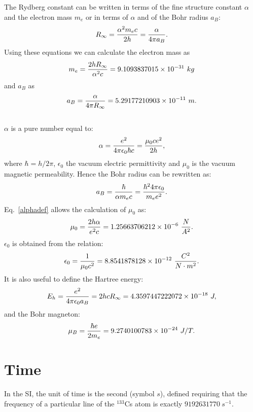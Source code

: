 \documentclass[12pt,a4paper]{article}
\def\me{9.1093837015\times 10^{-31}}
\def\abohr{5.29177210903\times 10^{-11}}
\def\muzero{1.25663706212\times 10^{-6}}
\def\epsilonzero{8.8541878128\times 10^{-12}}
\def\bohrmag{9.2740100783\times 10^{-24}}
\def\baru{4.3597447222072\times 10^{-18}}
\begin{document}
The Rydberg constant can be written in terms of the fine structure
constant $\alpha$ and the electron mass $m_e$ or in terms of $\alpha$ and
of the Bohr radius $a_B$:
\begin{equation}
R_\infty={\alpha^2 m_e c \over 2 h}={\alpha \over 4 \pi a_B}.
\end{equation}
Using these equations we can calculate the electron mass as
\begin{equation}
m_e={2 h R_\infty\over \alpha^2 c}=
\me\ kg
\end{equation} 
and $a_B$ as
\begin{equation}
a_B={\alpha\over 4\pi R_\infty}=
\abohr\ m.
\end{equation}
\\
$\alpha$ is a pure number equal to:
\begin{equation}
\alpha={e^2 \over 4 \pi \epsilon_0 \hbar c}= {\mu_0 c e^2 \over 2 h}, 
\label{alphadef}
\end{equation}
where $\hbar=h/2\pi$, $\epsilon_0$ the vacuum electric
permittivity and $\mu_0$ is the vacuum magnetic permeability. Hence
the Bohr radius can be rewritten as:
\begin{equation}
a_B={\hbar \over \alpha m_e c}=
{\hbar^2 4 \pi \epsilon_0 \over m_e e^2}.
\end{equation}
Eq.~\ref{alphadef} allows the calculation of $\mu_0$ as:
\begin{equation}
\mu_0={2 h \alpha \over e^2 c}=\muzero\ {N\over A^2}.
\label{mu0}
\end{equation}
$\epsilon_0$ is obtained from the relation:
\begin{equation}
\epsilon_0={1 \over \mu_0 c^2}=\epsilonzero\ 
{C^2\over N\cdot m^2}.
\label{epsilon0}
\end{equation}
It is also useful to define the Hartree energy:
\begin{equation}
E_h= {e^2\over 4\pi\epsilon_0 a_B}=2 h c R_\infty = \baru\ J,
\label{eh}
\end{equation}
and the Bohr magneton:
\begin{equation}
\mu_B = {\hbar e \over 2 m_e} = \bohrmag\ J/T.
\label{bohrm}
\end{equation}

\newpage
\section{\color{coral}Time}
In the SI, the unit of time is the second 
(symbol $s$), defined requiring that the frequency of a particular 
line of the $^{133}$Cs atom is exactly $9192631770\ s^{-1}$.
\\
\end{document}
